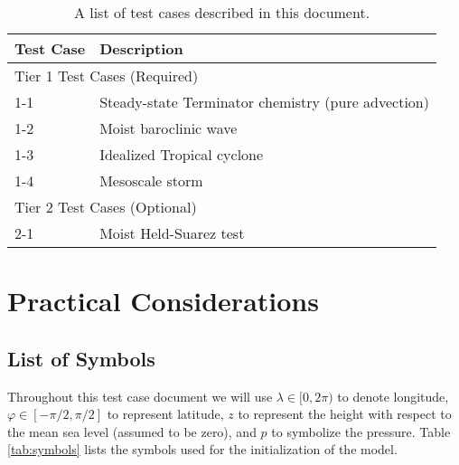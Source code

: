 \documentclass[times,doublespace]{fldauth}
\newcommand\T{\rule{0pt}{2.6ex}}
\newcommand\B{\rule[-1.2ex]{0pt}{0pt}}
\begin{document}
\begin{table}[h]

\caption{A list of test cases described in this document.} \label{tab:TestCases}
\begin{tabular*}{\textwidth}{@{\extracolsep{\fill}}ll}
\hline Test Case \T \B& Description \\
\hline \multicolumn{2}{l}{Tier 1 Test Cases (Required)} \T \B \\
\hline 1-1 \T & Steady-state Terminator chemistry (pure advection) \\
1-2 \T & Moist baroclinic wave \\
1-3 \T & Idealized Tropical cyclone \\
1-4 \T & Mesoscale storm \\
\hline \multicolumn{2}{l}{Tier 2 Test Cases (Optional)} \T \B \\  \hline 
2-1 \T \B & Moist Held-Suarez test  \\ \hline
\hline 
\end{tabular*}

\end{table}

\section{Practical Considerations}

\subsection{List of Symbols}
Throughout this test case document we will use $\lambda \in [0, 2 \pi)$ to denote longitude, $\varphi \in [-\pi/2, \pi/2]$ to represent latitude, $z$ to represent the height with respect to the mean sea level (assumed to be zero), and $p$ to symbolize the pressure. Table \ref{tab:symbols} lists the symbols used for the initialization of the model.
\end{document}
